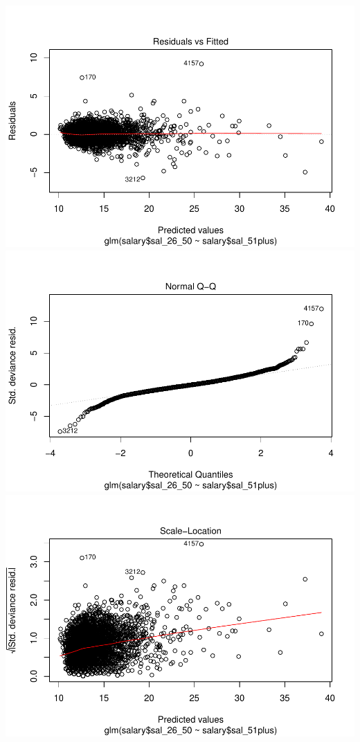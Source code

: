 \documentclass[]{article}
\begin{document}
\includegraphics{TSLproject_files/figure-latex/unnamed-chunk-15-3.pdf}
\includegraphics{TSLproject_files/figure-latex/unnamed-chunk-15-4.pdf}
\includegraphics{TSLproject_files/figure-latex/unnamed-chunk-15-5.pdf}
\end{document}

